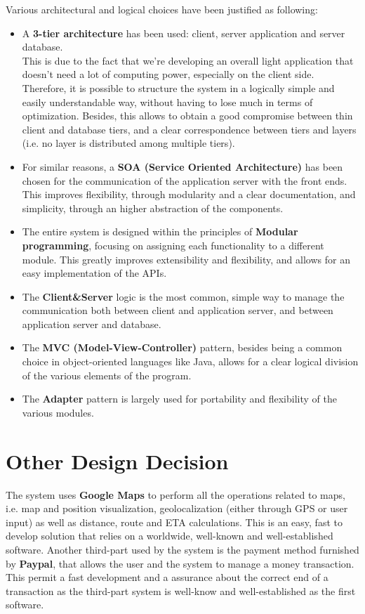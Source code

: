 Various architectural and logical choices have been justified as following:

\begin{itemize}

	\item A \textbf{3-tier architecture} has been used: client, server application and server database.\\
	This is due to the fact that we're developing an overall light application that doesn't need a lot of computing power, especially on the client side. Therefore, it is possible to structure the system in a logically simple and easily understandable way, without having to lose much in terms of optimization. Besides, this allows to obtain a good compromise between thin client and database tiers, and a clear correspondence between tiers and layers (i.e. no layer is distributed among multiple tiers).

	\item For similar reasons, a \textbf{SOA (Service Oriented Architecture)} has been chosen for the communication of the application server with the front ends. This improves flexibility, through modularity and a clear documentation, and simplicity, through an higher abstraction of the components.

	\item The entire system is designed within the principles of \textbf{Modular programming}, focusing on assigning each functionality to a different module. This greatly improves extensibility and flexibility, and allows for an easy implementation of the APIs.

	\item The \textbf{Client\&Server} logic is the most common, simple way to manage the communication both between client and application server, and between application server and database.

	\item The \textbf{MVC (Model-View-Controller)} pattern, besides being a common choice in object-oriented languages like Java, allows for a clear logical division of the various elements of the program.

	\item The \textbf{Adapter} pattern is largely used for portability and flexibility of the various modules.

\end{itemize}

\section{Other Design Decision}
The system uses \textbf{Google Maps} to perform all the operations related to maps, i.e. map and position visualization, geolocalization (either through GPS or user input) as well as distance, route and ETA calculations. This is an easy, fast to develop solution that relies on a worldwide, well-known and well-established software. Another third-part used by the system is the payment method furnished by \textbf{Paypal}, that allows the user and the system to manage a money transaction. This permit a fast development and a assurance about the correct end of a transaction as the third-part system is well-know and well-established as the first software. 
